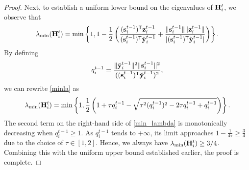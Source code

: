 \documentclass[10pt,a4paper]{amsart}
\newcommand{\m}[1]{{\bf{#1}}}
\newcommand{\tr}{^{\sf T}}
\begin{document}
\begin{proof}
	Next, to establish a uniform lower bound on the eigenvalues of ${\m{H}}_i^{t}$, we observe that
	\begin{equation}\label{minla}
		\lambda_{\min}({\m{H}}_i^{t})=\min\left\{1,1-\frac{1}{2}\left(\frac{(\m{s}^{t-1}_{i})\tr{\m{z}}^{t-1}_i}{(\m{s}^{t-1}_{i})\tr\breve{\m{y}}^{t-1}_i}+\frac{\|\m{s}^{t-1}_{i}\|\|{\m{z}}^{t-1}_i\|}{|(\m{s}^{t-1}_{i})\tr\breve{\m{y}}^{t-1}_i|}\right)\right\}.
	\end{equation}
	By defining
	$$
	q_i^{t-1}=\frac{\|\breve{\m{y}}^{t-1}_i\|^2\|{\m{s}}^{t-1}_i\|^2}{((\m{s}^{t-1}_{i})\tr\breve{\m{y}}^{t-1}_i)^2},
	$$
	we can rewrite \eqref{minla} as
	\begin{equation}\label{min_lambda}	
		\lambda_{\min}({\m{H}}_i^{t})=\min\left\{1,\frac{1}{2}\left(1+\tau q_i^{t-1}-\sqrt{\tau^2 (q_i^{t-1})^2-2 \tau q_i^{t-1} + q_i^{t-1}}\right)\right\}.
	\end{equation}
	The second term on the right-hand side of \eqref{min_lambda} is monotonically decreasing when $q_i^{t-1} \geq 1$. As $q_i^{t-1}$ tends to $+\infty$, its limit approaches $1 - \frac{1}{4\tau} \geq \frac{3}{4}$ due to the choice of $\tau \in [1,2]$.
	Hence, we always have $\lambda_{\min}({\m{H}}_i^{t}) \geq 3/4$.
	Combining this with the uniform upper bound established earlier, the proof is complete.
\end{proof}
\end{document}
